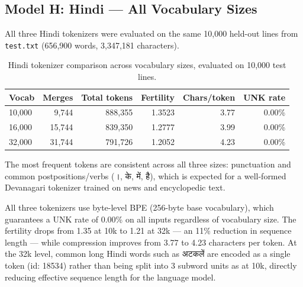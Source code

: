 \documentclass[11pt]{article}
\newcommand{\dn}[1]{{\devanagarifont #1}}
\begin{document}
\subsection{Model H: Hindi --- All Vocabulary Sizes}

All three Hindi tokenizers were evaluated on the same 10{,}000 held-out lines from \texttt{test.txt} (656{,}900 words, 3{,}347{,}181 characters).

\begin{table}[h]
\centering
\begin{tabular}{lrrrrr}
\toprule
\textbf{Vocab} & \textbf{Merges} & \textbf{Total tokens} & \textbf{Fertility} & \textbf{Chars/token} & \textbf{UNK rate} \\
\midrule
10{,}000 & 9{,}744  & 888{,}355 & 1.3523 & 3.77 & 0.00\% \\
16{,}000 & 15{,}744 & 839{,}350 & 1.2777 & 3.99 & 0.00\% \\
32{,}000 & 31{,}744 & 791{,}726 & 1.2052 & 4.23 & 0.00\% \\
\bottomrule
\end{tabular}
\caption{Hindi tokenizer comparison across vocabulary sizes, evaluated on 10{,}000 test lines.}
\end{table}

The most frequent tokens are consistent across all three sizes: punctuation and common postpositions/verbs (\dn{।}, \dn{के}, \dn{में}, \dn{है}), which is expected for a well-formed Devanagari tokenizer trained on news and encyclopedic text.

\begin{figure}[h]
\centering
{}
\end{figure}

All three tokenizers use byte-level BPE (256-byte base vocabulary), which guarantees a UNK rate of 0.00\% on all inputs regardless of vocabulary size. The fertility drops from 1.35 at 10k to 1.21 at 32k --- an 11\% reduction in sequence length --- while compression improves from 3.77 to 4.23 characters per token. At the 32k level, common long Hindi words such as \dn{अटकलें} are encoded as a single token (id: 18534) rather than being split into 3 subword units as at 10k, directly reducing effective sequence length for the language model.
\end{document}
